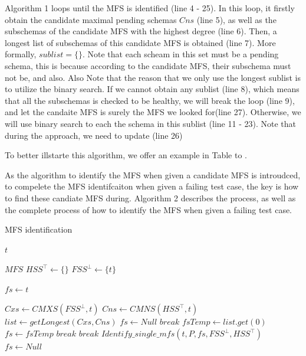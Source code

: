 \documentclass{sig-alternate-05-2015}
\begin{document}
{{Algorithm 1 loops until the MFS is identified (line 4 - 25). In this loop, it firstly obtain the candidate maximal pending schemas $Cns$ (line 5), as well as the subschemas of the candidate MFS with the highest degree (line 6). Then, a longest list of subschemas of this candidate MFS is obtained (line 7). More formally, $sublist = \{ \}$. Note that each scheam in this set must be a pending schema, this is because according to the candidate MFS, their subschema must not be, and also.   Also Note that the reason that we only use the longest sublist is to utilize the binary search. If we cannot obtain any sublist (line 8), which means that all the subschemas is checked to be healthy, we will break the loop (line 9), and let the candaite MFS is surely the MFS we looked for(line 27). Otherwise, we will use binary search to each the schema in this sublist (line 11 - 23).
Note that during the approach, we need to update (line 26)


To better illstarte this algorithm, we offer an example in Table to .

As the algorithm to identify the MFS when given a candidate MFS is introudced, to compelete the MFS identifcaiton when given a failing test case, the key is how to find these candiate MFS during. Algorithm 2 describes the process, as well as the complete process of how to identify the MFS when given a failing test case.



\begin{algorithm}\label{al:identify}
  \caption{MFS identification}
  \begin{algorithmic}[1]
     \Require  $t$ 


     \Ensure  $MFS$ 
    \State $HSS^{\top} \leftarrow \{\}$
    \State $FSS^{\bot} \leftarrow \{ t \} $


    \State $fs \leftarrow t $

        \State $Cxs \leftarrow CMXS(FSS^{\bot}, t) $
        \State $Cns \leftarrow CMNS(HSS^{\top}, t) $
                \State $list \leftarrow getLongest(Cxs, Cns) $
                    \State $fs \leftarrow Null$
                    \State $break$
                \EndIf
                \State $fsTemp \leftarrow list.get(0)$
                    \State $fs \leftarrow fsTemp$
                    \State $break$
                \EndIf
            \EndWhile
        \EndIf
            \State $break$
        \Else
        \State $Identify\_single\_mfs(t, P, fs, FSS^{\bot}, HSS^{\top})$
        \State $fs \leftarrow Null$
        \EndIf


\end{algorithmic}
\end{algorithm}}}
\end{document}

